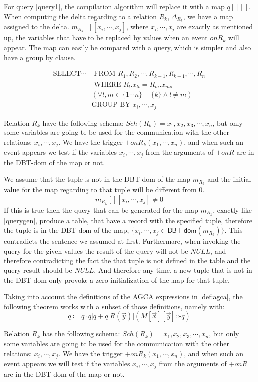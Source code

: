 \documentclass[12pt]{article}
\newcommand{\dom}{\textsf{DBT-dom}}
\begin{document}
For query \eqref{query1}, the compilation algorithm will replace it with a map $q[][]$. When computing the delta regarding to a relation $R_k$, $\Delta_{R_k}$, we have a map assigned to the delta. $m_{R_k}[][x_i,\cdots,x_j]$, where $x_i,\cdots,x_j$ are exactly as mentioned up, the variables that have to be replaced by values when an event $onR_k$ will appear. The map can easily be compared with a query, which is simpler and also have a group by clause.

\begin{align}
\text{SELECT}\cdots&\text{ FROM }R_1,R_2,\cdots,R_{k-1},R_{k+1},\cdots,R_n\label{querygen}\\
&\text{ WHERE }R_l.x_{lt}=R_m.x_{ms}\nonumber\\
&(\forall l,m\in\{1\cdots n\}-\{k\}\land l\not=m)\nonumber\\
&\text{GROUP BY } x_i,\cdots,x_j\nonumber
\end{align}
	
Relation $R_k$ have the following schema: $Sch(R_k)={x_1,x_2,x_3,\cdots,x_n}$, but only some variables are going to be used for the communication with the other relations: $x_i,\cdots,x_j$. We  have the trigger $+onR_k(x_1,\cdots,x_n)$, and when such an event appears we  test if the variables $x_i,\cdots,x_j$ from the arguments of $+onR$ are in the \dom{} of the map or not. 
	
We assume that the tuple is not in the \dom{} of the map $m_{R_k}$ and the initial value for the map regarding to that tuple will be different from 0.
$$m_{R_k}[][x_i,\cdots,x_j]\not= 0$$
If this is true then the query that can be generated for the map $m_{R_k}$, exactly like \eqref{querygen},
 produce a table, that have a record with the specified tuple, therefore the tuple is in the \dom{} of the map, $\{x_i,\cdots,x_j\in \dom(m_{R_k}) \}$. This contradicts the sentence we assumed at first. Furthermore, when invoking the query for the given values the result of the query will not be $NULL$, and therefore contradicting the fact the that tuple is not defined in the table and the query result should be $NULL$. And therefore any time, a new tuple that is not in the \dom{} only provoke a zero initialization of the map for that tuple.

Taking into account the definitions of the AGCA expressions in \eqref{def:agca}, the following theorem works with a subset of those definitions, namely with:
$$q\coloneqq q\cdot q | q + q|R(\vec{y})|(M[\vec{x}][\vec{y}]\text{::-}q)$$
	
Relation $R_k$ has the following schema: $Sch(R_k)={x_1,x_2,x_3,\cdots,x_n}$, but only some variables are going to be used for the communication with the other relations: $x_i,\cdots,x_j$. We have the trigger $+onR_k(x_1,\cdots,x_n)$, and when such an event appears we will test if the variables $x_i,\cdots,x_j$ from the arguments of $+onR$ are in the \dom{} of the map or not. 
	
\end{document}
